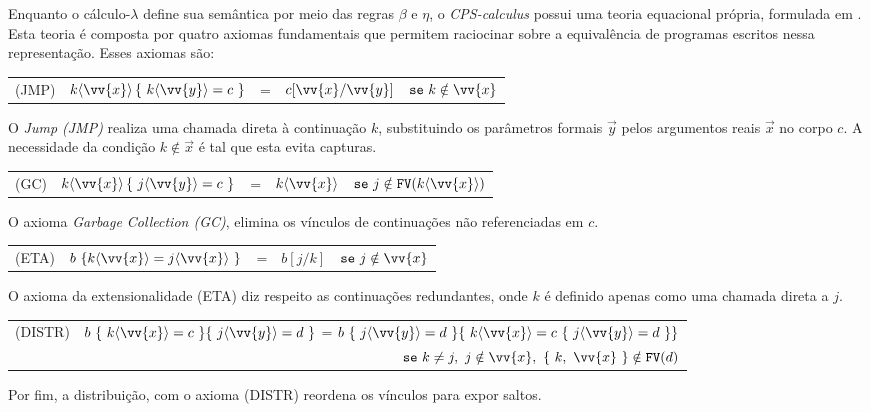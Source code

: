 Enquanto o cálculo-$\lambda$ define sua semântica por meio das regras $\beta$ e $\eta$, o \textit{CPS-calculus} possui uma teoria equacional própria, formulada em .
Esta teoria é composta por quatro axiomas fundamentais que permitem raciocinar sobre a equivalência de programas escritos nessa representação.
Esses axiomas são:

\phantom{NewLine}

\begin{center}
     \begin{tabular}{llllr}
          (JMP) & $k\langle \vv{x} \rangle \, \{\ k\langle \vv{y} \rangle = c\ \}$ & = & $c[\vv{x} / \vv{y}]$ & $\mathtt{se}\ k \notin \vv{x}$ \\
     \end{tabular}
\end{center}
O \textit{Jump (JMP)} realiza uma chamada direta à continuação $k$, substituindo os parâmetros formais $\vec{y}$ pelos argumentos reais $\vec{x}$ no corpo $c$.
A necessidade da condição $k \notin \vec{x}$ é tal que esta evita capturas.

\begin{center}
     \begin{tabular}{llllr}
          (GC)    & $k\langle \vv{x} \rangle \, \{\ j\langle \vv{y} \rangle = c\ \}$ & = & $k\langle \vv{x} \rangle$ & $\mathtt{se}\ j \notin \mathtt{FV}(k\langle \vv{x}\rangle)$ \\
     \end{tabular}
\end{center}
O axioma \textit{Garbage Collection (GC)}, elimina os vínculos de continuações não referenciadas em $c$.

\begin{center}
     \begin{tabular}{llllr}
          (ETA)   & $b\ \{ k\langle \vv{x} \rangle = j\langle \vv{x} \rangle\ \}$ & = & $b[j / k]$ & $\mathtt{se}\ j \notin \vv{x}$ \\
     \end{tabular}
\end{center}
O axioma da extensionalidade (ETA) diz respeito as continuações redundantes, onde $k$ é definido apenas como uma chamada direta a $j$.

\begin{center}
     \begin{tabular}{llllr}
          (DISTR) & \multicolumn{4}{l}{$b\ \{\ k\langle \vv{x} \rangle = c\ \} \{\ j\langle \vv{y} \rangle = d\ \}$ = $b\ \{\ j\langle \vv{y} \rangle = d\ \} \{\ k\langle \vv{x} \rangle = c\ \{\ j\langle \vv{y} \rangle = d\ \} \}$} \\
                  & \multicolumn{4}{r}{$\mathtt{se}\ k \ne j,\ j \notin \vv{x},\ \{\ k,\ \vv{x} \ \} \notin \mathtt{FV}(d)$} \\
     \end{tabular}
\end{center}
Por fim, a distribuição, com o axioma (DISTR) reordena os vínculos para expor saltos.

